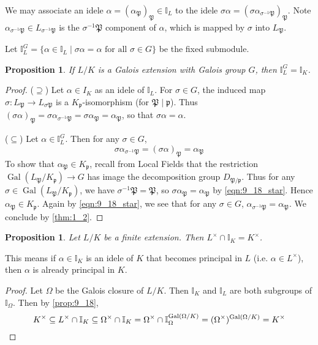 \documentclass[11pt]{article}
\theoremstyle{definition}
\theoremstyle{plain}
\newtheorem{proposition}[definition]{Proposition}
\theoremstyle{remark}
\DeclareMathOperator{\Gal}{Gal}
\newcommand{\II}{\mathbb{I}}
\newcommand{\cp}{\mathfrak{P}}
\newcommand{\fp}{\mathfrak{p}}
\begin{document}
We may associate an idele $\alpha = (\alpha_\cp)_\cp \in \II_L$ to the idele $\sigma \alpha = (\sigma \alpha_{\sigma^{-1} \cp})_\cp$. Note $\alpha_{\sigma^{-1} \cp} \in L_{\sigma^{-1} \cp}$ is the $\sigma^{-1}\cp$ component of $\alpha$, which is mapped by $\sigma$ into $L_\cp$.

Let $\II_L^G = \{\alpha \in \II_L \mid \sigma \alpha = \alpha \text{ for all } \sigma \in G\}$ be the fixed submodule.

\begin{proposition}\label{prop:9_18}
    If $L/K$ is a Galois extension with Galois group $G$, then $\II_L^G = \II_K$.
\end{proposition}
\begin{proof}
    ($\supseteq$) Let $\alpha \in I_K$ as an idele of $\II_L$. For $\sigma \in G$, the induced map $\sigma : L_\cp \to L_{\sigma \cp}$ is a $K_\fp$-isomorphism (for $\cp \mid \fp$). Thus $(\sigma \alpha)_\cp = \sigma \alpha_{\sigma^{-1} \cp} = \sigma \alpha_\cp = \alpha_\cp$, so that $\sigma \alpha = \alpha$.

    ($\subseteq$) Let $\alpha \in \II_L^G$. Then for any $\sigma \in G$,
    \begin{equation}\label{eqn:9_18_star}
        \sigma \alpha_{\sigma^{-1} \cp} = (\sigma \alpha)_\cp = \alpha_\cp
    \end{equation}
    To show that $\alpha_\cp \in K_\fp$, recall from Local Fields that the restriction $\Gal(L_\cp / K_\fp) \to G$ has image the decomposition group $D_{\cp / \fp}$. Thus for any $\sigma \in \Gal(L_\cp / K_\fp)$, we have $\sigma^{-1}\cp = \cp$, so $\sigma \alpha_\cp = \alpha_\cp$ by \eqref{eqn:9_18_star}. Hence $\alpha_\cp \in K_\fp$. Again by \eqref{eqn:9_18_star}, we see that for any $\sigma \in G$, $\alpha_{\sigma^{-1}\cp} = \alpha_\cp$. We conclude by \autoref{thm:1_2}.
\end{proof}

\begin{proposition}\label{prop:9_19}
    Let $L/K$ be a finite extension. Then $L^\times \cap \II_K = K^\times$.
\end{proposition}
This means if $\alpha \in \II_K$ is an idele of $K$ that becomes principal in $L$ (i.e. $\alpha \in L^\times$), then $\alpha$ is already principal in $K$.
\begin{proof}
    Let $\Omega$ be the Galois closure of $L/K$. Then $\II_K$ and $\II_L$ are both subgroups of $\II_\Omega$. Then by \autoref{prop:9_18},
    \begin{equation*}
        K^\times \subseteq L^\times \cap \II_K \subseteq \Omega^\times \cap \II_K = \Omega^\times \cap \II_\Omega^{\Gal(\Omega / K)} = (\Omega^\times)^{\Gal(\Omega/K)} = K^\times \qedhere
    \end{equation*}
\end{proof}
\end{document}
